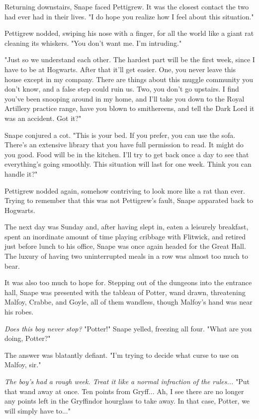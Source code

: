 Returning downstairs, Snape faced Pettigrew. It was the closest contact the two had ever had in their lives. "I do hope you realize how I feel about this situation."

Pettigrew nodded, swiping his nose with a finger, for all the world like a giant rat cleaning its whiskers. "You don't want me. I'm intruding."

"Just so we understand each other. The hardest part will be the first week, since I have to be at Hogwarts. After that it'll get easier. One, you never leave this house except in my company. There are things about this muggle community you don't know, and a false step could ruin us. Two, you don't go upstairs. I find you've been snooping around in my home, and I'll take you down to the Royal Artillery practice range, have you blown to smithereens, and tell the Dark Lord it was an accident. Got it?"

Snape conjured a cot. "This is your bed. If you prefer, you can use the sofa. There's an extensive library that you have full permission to read. It might do you good. Food will be in the kitchen. I'll try to get back once a day to see that everything's going smoothly. This situation will last for one week. Think you can handle it?"

Pettigrew nodded again, somehow contriving to look more like a rat than ever. Trying to remember that this was not Pettigrew's fault, Snape apparated back to Hogwarts.

The next day was Sunday and, after having slept in, eaten a leisurely breakfast, spent an inordinate amount of time playing cribbage with Flitwick, and retired just before lunch to his office, Snape was once again headed for the Great Hall. The luxury of having two uninterrupted meals in a row was almost too much to bear.

It was also too much to hope for. Stepping out of the dungeons into the entrance hall, Snape was presented with the tableau of Potter, wand drawn, threatening Malfoy, Crabbe, and Goyle, all of them wandless, though Malfoy's hand was near his robes.

\emph{Does this boy never stop?} "Potter!" Snape yelled, freezing all four. "What are you doing, Potter?"

The answer was blatantly defiant. "I'm trying to decide what curse to use on Malfoy, sir."

\emph{The boy's had a rough week. Treat it like a normal infraction of the rules...} "Put that wand away at once. Ten points from Gryff... Ah, I see there are no longer any points left in the Gryffindor hourglass to take away. In that case, Potter, we will simply have to..."

